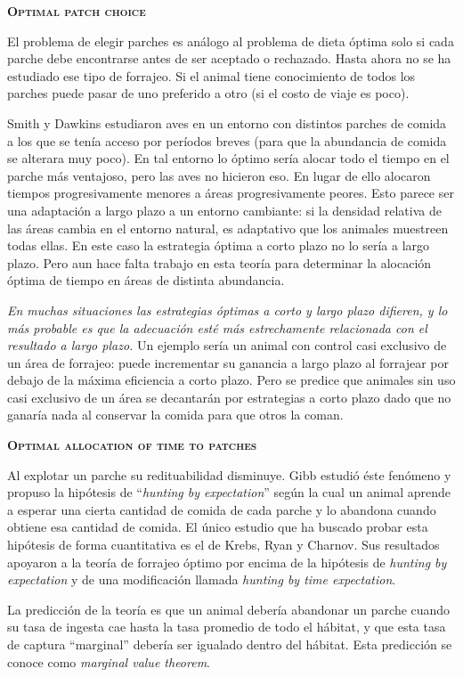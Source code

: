\documentclass[a4paper,12pt]{article}
\begin{document}
{\scshape\bfseries Optimal patch choice}

El problema de elegir parches es análogo al problema de dieta óptima solo si cada parche debe encontrarse antes de ser aceptado o rechazado. Hasta ahora no se ha estudiado ese tipo de forrajeo. Si el animal tiene conocimiento de todos los parches puede pasar de uno preferido a otro (si el costo de viaje es poco).

Smith y Dawkins estudiaron aves en un entorno con distintos parches de comida a los que se tenía acceso por períodos breves (para que la abundancia de comida se alterara muy poco). En tal entorno lo óptimo sería alocar todo el tiempo en el parche más ventajoso, pero las aves no hicieron eso. En lugar de ello alocaron tiempos progresivamente menores a áreas progresivamente peores. Esto parece ser una adaptación a largo plazo a un entorno cambiante: si la densidad relativa de las áreas cambia en el entorno natural, es adaptativo que los animales muestreen todas ellas. En este caso la estrategia óptima a corto plazo no lo sería a largo plazo. Pero aun hace falta trabajo en esta teoría para determinar la alocación óptima de tiempo en áreas de distinta abundancia.

{\itshape En muchas situaciones las estrategias óptimas a corto y largo plazo difieren, y lo más probable es que la adecuación esté más estrechamente relacionada con el resultado a largo plazo.} Un ejemplo sería un animal con control casi exclusivo de un área de forrajeo: puede incrementar su ganancia a largo plazo al forrajear por debajo de la máxima eficiencia a corto plazo. Pero se predice que animales sin uso casi exclusivo de un área se decantarán por estrategias a corto plazo dado que no ganaría nada al conservar la comida para que otros la coman.

{\scshape\bfseries Optimal allocation of time to patches}

Al explotar un parche su redituabilidad disminuye. Gibb estudió éste fenómeno y propuso la hipótesis de ``{\itshape hunting by expectation}'' según la cual un animal aprende a esperar una cierta cantidad de comida de cada parche y lo abandona cuando obtiene esa cantidad de comida. El único estudio que ha buscado probar esta hipótesis de forma cuantitativa es el de Krebs, Ryan y Charnov. Sus resultados apoyaron a la teoría de forrajeo óptimo por encima de la hipótesis de {\itshape hunting by expectation} y de una modificación llamada {\itshape hunting by time expectation}. 

La predicción de la teoría es que un animal debería abandonar un parche cuando su tasa de ingesta cae hasta la tasa promedio de todo el hábitat, y que esta tasa de captura ``marginal'' debería ser igualado dentro del hábitat. Esta predicción se conoce como {\itshape marginal value theorem}. 
\end{document}
